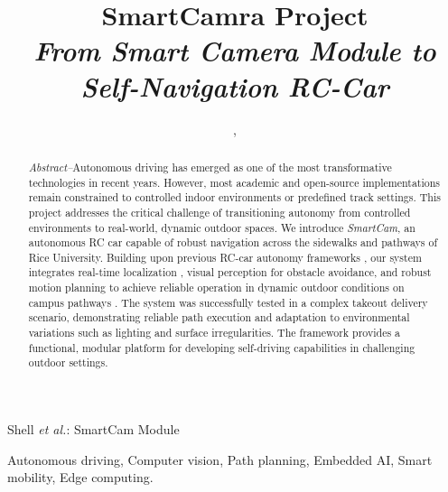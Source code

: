 \documentclass[journal,transmag]{IEEEtran}
\begin{document}
%
\title{
  \textbf{SmartCamra Project} \\[0.3em]
  {\Large \textit{From Smart Camera Module to Self-Navigation RC-Car}}
}

\author{,
}

%
{Shell \MakeLowercase{\textit{et al.}}: SmartCam Module}

\maketitle %

\begin{abstract}
\textit{Abstract--}Autonomous driving has emerged as one of the most transformative technologies in recent years. However, most academic and open-source implementations remain constrained to controlled indoor environments or predefined track settings. This project addresses the critical challenge of transitioning autonomy from controlled environments to real-world, dynamic outdoor spaces. We introduce \textit{SmartCam}, an autonomous RC car capable of robust navigation across the sidewalks and pathways of Rice University. Building upon previous RC-car autonomy frameworks \cite{cairo_rc, donkeycar}, our system integrates real-time localization \cite{SLAM}, visual perception for obstacle avoidance, and robust motion planning to achieve reliable operation in dynamic outdoor conditions on campus pathways \cite{OpenStreetMap}. The system was successfully tested in a complex takeout delivery scenario, demonstrating reliable path execution and adaptation to environmental variations such as lighting and surface irregularities. The framework provides a functional, modular platform for developing self-driving capabilities in challenging outdoor settings.
\end{abstract}

\begin{IEEEkeywords}
Autonomous driving, Computer vision, Path planning, Embedded AI, Smart mobility, Edge computing.
\end{IEEEkeywords}


\end{document}
